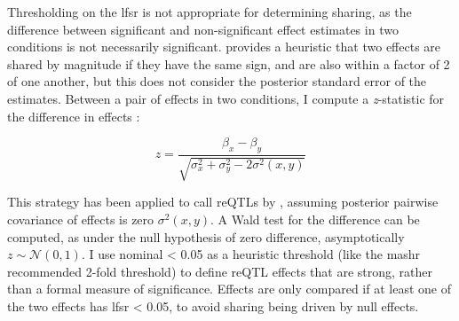 Thresholding on the lfsr is not appropriate for determining sharing, as the difference between significant and non-significant effect estimates in two conditions is not necessarily significant\autocite{schenker2001JudgingSignificanceDifferences,gelman2006DifferenceSignificantNot}.
\autocite{urbut2018FlexibleStatisticalMethods} provides a heuristic that two effects are shared by magnitude if they have the same sign, and are also within a factor of 2 of one another,
but this does not consider the posterior standard error of the estimates.
Between a pair of effects in two conditions, I compute a \textit{z}-statistic for the difference in effects \autocite{clogg1995StatisticalMethodsComparing,schenker2001JudgingSignificanceDifferences}:

\begin{equation}
z = \frac{\beta_x - \beta_y}{\sqrt{\sigma_x^2 + \sigma_y^2 - 2\sigma^2(x, y)}}
\end{equation}

This strategy has been applied to call reQTLs by \autocite{kim-hellmuth2017GeneticRegulatoryEffects},
assuming posterior pairwise covariance of effects is zero $\sigma^2(x, y)$.
A Wald test \pvalue{} for the difference can be computed, as under the null hypothesis of zero difference, asymptotically $z \sim \mathcal{N}(0, 1)$.
I use nominal \pvalue{} < 0.05 as a heuristic threshold (like the mashr recommended 2-fold threshold) to define reQTL effects that are strong, rather than a formal measure of significance.
Effects are only compared if at least one of the two effects has lfsr < 0.05, to avoid sharing being driven by null effects.

